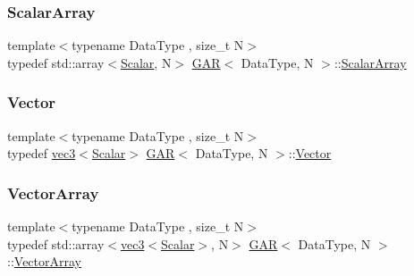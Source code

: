 \mbox{\label{class_g_a_r_a0b446684ae922457a3bf86c904085d8a}} 
\subsubsection{\texorpdfstring{Scalar\+Array}{ScalarArray}}
{\footnotesize\ttfamily template$<$typename Data\+Type , size\+\_\+t N$>$ \\
typedef std\+::array$<$\mbox{\hyperlink{class_g_a_r_a2ae44eda8e28d5dd26cf707dcda69314}{Scalar}}, N$>$ \mbox{\hyperlink{class_g_a_r}{G\+AR}}$<$ Data\+Type, N $>$\+::\mbox{\hyperlink{class_g_a_r_a0b446684ae922457a3bf86c904085d8a}{Scalar\+Array}}}

\mbox{\label{class_g_a_r_ad2f5b930feb3831a717f96155b3ff74e}} 
\subsubsection{\texorpdfstring{Vector}{Vector}}
{\footnotesize\ttfamily template$<$typename Data\+Type , size\+\_\+t N$>$ \\
typedef \mbox{\hyperlink{structvec3}{vec3}}$<$\mbox{\hyperlink{class_g_a_r_a2ae44eda8e28d5dd26cf707dcda69314}{Scalar}}$>$ \mbox{\hyperlink{class_g_a_r}{G\+AR}}$<$ Data\+Type, N $>$\+::\mbox{\hyperlink{class_g_a_r_ad2f5b930feb3831a717f96155b3ff74e}{Vector}}}

\mbox{\label{class_g_a_r_a5818e17eb203504af6e10f38fc38d378}} 
\subsubsection{\texorpdfstring{Vector\+Array}{VectorArray}}
{\footnotesize\ttfamily template$<$typename Data\+Type , size\+\_\+t N$>$ \\
typedef std\+::array$<$\mbox{\hyperlink{structvec3}{vec3}}$<$\mbox{\hyperlink{class_g_a_r_a2ae44eda8e28d5dd26cf707dcda69314}{Scalar}}$>$, N$>$ \mbox{\hyperlink{class_g_a_r}{G\+AR}}$<$ Data\+Type, N $>$\+::\mbox{\hyperlink{class_g_a_r_a5818e17eb203504af6e10f38fc38d378}{Vector\+Array}}}



